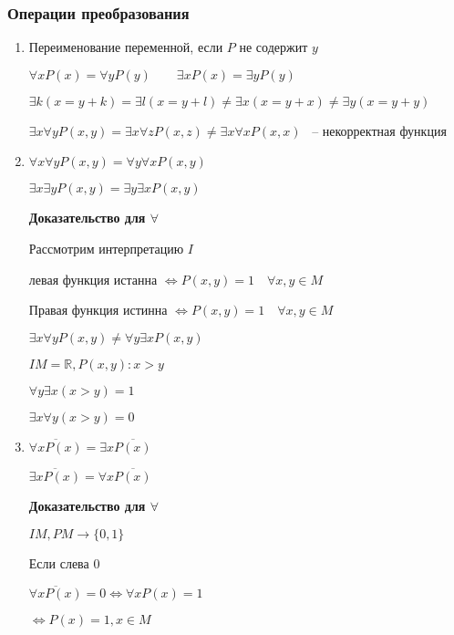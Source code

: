 \documentclass[russian]{lecture-notes}
\begin{document}
\subsubsection{Операции преобразования}

\begin{enumerate}

\item{
	Переименование переменной, если $P$ не содержит $y$
	
	$\forall x P(x) = \forall y P(y) \qquad \exists x P(x) = \exists y P(y)$

	$\exists k (x = y + k) = \exists l (x = y + l) \neq \exists x (x = y + x) \neq \exists y (x = y + y)$
	
	$\exists x \forall y P(x, y) = \exists x \forall z P (x, z) \neq \exists x \forall x P(x, x)$ ~-- некорректная функция
}

\item{
	$\forall x \forall y P(x, y) = \forall y \forall x P(x, y)$

	$\exists x \exists y P(x, y) = \exists y \exists x P(x, y)$
	
	
	\textbf{Доказательство для $\forall$}
	
	Рассмотрим интерпретацию $I$
	
	левая функция истанна $\Leftrightarrow P(x, y) = 1 \quad \forall x, y \in M$
	
	Правая функция истинна $\Leftrightarrow P(x, y) = 1 \quad \forall x, y \in M$
	
	\begin{remark}
		$\exists x \forall y P(x, y) \neq \forall y \exists x P(x, y)$
		
		$I M = \mathbb{R}, P(x, y): x > y$
		
		$\forall y \exists x (x > y) = 1$
		
		$\exists x \forall y (x > y) = 0$
	\end{remark}
}

\item{
	$\overline{\forall x P(x)} = \exists x \overline{P(x)}$
	
	$\overline{\exists x P(x)} = \forall x \overline{P(x)}$
	
	\textbf{Доказательство для $\forall$}
	
	$I M, P M \rightarrow \{ 0, 1\}$
	
	Если слева 0
	
	$\overline{\forall x P(x)} = 0 \Leftrightarrow \forall x P(x) = 1$
	
	$\Leftrightarrow P(x) = 1, x \in M$
	
}
\end{enumerate}
\end{document}
